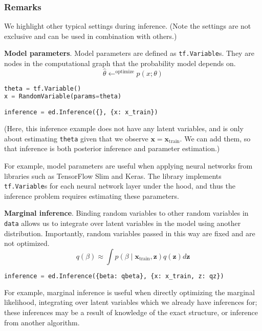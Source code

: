 \subsubsection{Remarks}

We highlight other typical settings during inference. (Note the settings are not exclusive and can be used in combination with others.)

\textbf{Model parameters}.
Model parameters are defined as \texttt{tf.Variable}s. They are
nodes in the computational graph that the probability model
depends on.
\begin{equation*}
\hat{\theta} \leftarrow^{\text{optimize}}
p(x; \theta)
\end{equation*}

\begin{lstlisting}[language=Python]
theta = tf.Variable()
x = RandomVariable(params=theta)

inference = ed.Inference({}, {x: x_train})
\end{lstlisting}
(Here, this inference example does not have any latent variables, and is only about estimating \texttt{theta} given that we observe $\mathbf{x} = \mathbf{x}_{\text{train}}$. We can add them, so that inference is both posterior inference and parameter estimation.)

For example, model parameters are useful when applying neural networks
from libraries such as TensorFlow Slim and Keras. The library
implements \texttt{tf.Variable}s  for each neural network layer under
the hood, and thus the inference problem requires estimating these
parameters.

\textbf{Marginal inference}.
Binding random variables to other random variables in \texttt{data} allows
us to integrate over latent variables in the model using another
distribution. Importantly, random variables passed in this way are
fixed and are not optimized.
\begin{equation*}
q(\beta)\approx
\int p(\beta\mid\mathbf{x}_{\text{train}}, \mathbf{z}) q(\mathbf{z}) d\mathbf{z}
\end{equation*}

\begin{lstlisting}[language=Python]
inference = ed.Inference({beta: qbeta}, {x: x_train, z: qz})
\end{lstlisting}

For example, marginal inference is useful when directly optimizing the
marginal likelihood, integrating over latent variables which we
already have inferences for; these inferences may be a result of knowledge of
the exact structure, or inference from another algorithm.


